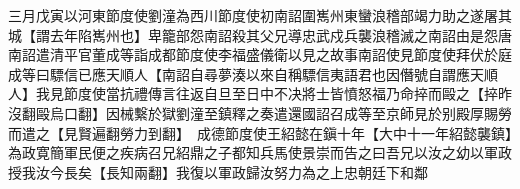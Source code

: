 三月戊寅以河東節度使劉潼為西川節度使初南詔圍嶲州東蠻浪稽部竭力助之遂屠其城【謂去年陷嶲州也】卑籠部怨南詔殺其父兄導忠武戍兵襲浪稽滅之南詔由是怨唐南詔遣清平官董成等詣成都節度使李福盛儀衛以見之故事南詔使見節度使拜伏於庭成等曰驃信已應天順人【南詔自尋夢湊以來自稱驃信夷語君也因僭號自謂應天順人】我見節度使當抗禮傳言往返自旦至日中不决將士皆憤怒福乃命捽而毆之【捽昨沒翻毆烏口翻】因械繫於獄劉潼至鎮釋之奏遣還國詔召成等至京師見於别殿厚賜勞而遣之【見賢遍翻勞力到翻】　成德節度使王紹懿在鎭十年【大中十一年紹懿襲鎮】為政寛簡軍民便之疾病召兄紹鼎之子都知兵馬使景崇而告之曰吾兄以汝之幼以軍政授我汝今長矣【長知兩翻】我復以軍政歸汝努力為之上忠朝廷下和鄰